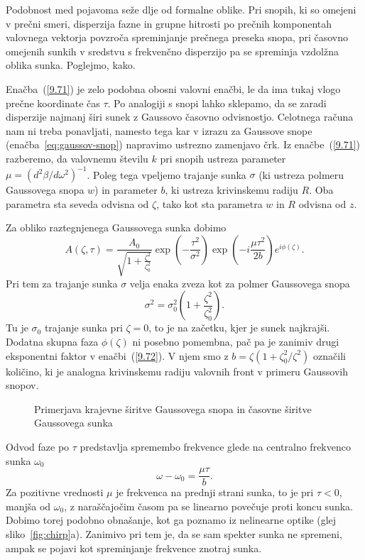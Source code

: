 Podobnost med pojavoma seže dlje od formalne oblike. Pri snopih, ki so omejeni 
v prečni smeri, disperzija fazne in grupne hitrosti po prečnih komponentah valovnega
vektorja povzroča spreminjanje prečnega preseka snopa, pri časovno
omejenih sunkih v sredstvu s frekvenčno disperzijo pa se spreminja
vzdolžna oblika sunka. Poglejmo, kako.

Enačba~(\ref{9.71}) je zelo podobna obosni valovni enačbi, le da ima tukaj vlogo 
prečne koordinate čas $\tau$. Po analogiji s snopi lahko sklepamo, da se zaradi
disperzije najmanj širi sunek z Gaussovo časovno odvisnostjo. Celotnega računa
nam ni treba ponavljati, namesto tega kar v izrazu za Gaussove snope 
(enačba~\ref{eq:gaussov-snop}) napravimo ustrezno zamenjavo črk. 
Iz enačbe~(\ref{9.71}) razberemo, da valovnemu številu $k$ pri snopih  
ustreza parameter $\mu=(d^{2}\beta/d\omega^{2})^{-1}$. Poleg tega vpeljemo
trajanje sunka $\sigma$ (ki ustreza polmeru Gaussovega snopa $w$) in parameter
$b$, ki ustreza krivinskemu radiju $R$. Oba parametra sta seveda odvisna od $\zeta$, 
tako kot sta parametra $w$ in $R$ odvisna od $z$. 

Za obliko raztegnjenega Gaussovega sunka dobimo 
\begin{equation}
A\left(\zeta,\tau\right)=\frac{A_{0}}{\sqrt{1+\frac{\zeta^{2}
}{\zeta_{0}^{2}}}}\exp\left(-\frac{\tau^{2}}{\sigma^{2}}\right)\exp
\left(-i\frac{\mu\tau^{2}}{2b}\right)e^{i\phi\left(\zeta\right)}.
\label{9.72}
\end{equation}
Pri tem za trajanje sunka $\sigma$ velja enaka zveza kot za polmer Gaussovega snopa
\begin{equation}
\sigma^{2}=\sigma_{0}^{2}\left(1+\frac{\zeta^{2}}{\zeta_{0}^{2}}\right).
\label{9.73}
\end{equation}
Tu je $\sigma_{0}$ trajanje sunka pri $\zeta=0$, to je na začetku,
kjer je sunek najkrajši. Dodatna skupna faza $\phi\left(\zeta\right)$
ni posebno pomembna, pač pa je zanimiv drugi eksponentni faktor v
enačbi~(\ref{9.72}). V njem smo z $b=\zeta\left(1+\zeta_{0}^{2}/\zeta^{2}\right)$
označili količino, ki je analogna krivinskemu radiju valovnih front
v primeru Gaussovih snopov. 
\begin{figure}[h]
\centering
\def\svgwidth{120truemm} 

\caption{Primerjava krajevne širitve Gaussovega snopa in časovne širitve Gaussovega sunka}
\label{fig:Gausstau}
\end{figure}

Odvod faze po $\tau$ predstavlja spremembo
frekvence glede na centralno frekvenco sunka $\omega_{0}$
\begin{equation}
\omega-\omega_{0}=\frac{\mu\tau}{b}.
\label{9.74}
\end{equation}
Za pozitivne vrednosti $\mu$ je frekvenca na prednji strani sunka,
to je pri $\tau<0$, manjša od $\omega_0$, z naraščajočim časom pa se 
linearno povečuje proti koncu sunka.
Dobimo torej podobno obnašanje, kot ga poznamo iz nelinearne optike
(glej sliko~\ref{fig:chirp}a). Zanimivo pri tem je, da se sam spekter
sunka ne spremeni, ampak se pojavi kot spreminjanje frekvence znotraj sunka.

